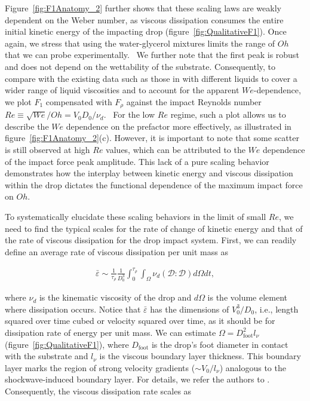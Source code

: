 \documentclass{jfm}
\begin{document}
	Figure~\ref{fig:F1Anatomy_2} further shows that these scaling laws are weakly dependent on the Weber number, as viscous dissipation consumes the entire initial kinetic energy of the impacting drop (figure~\ref{fig:QualitativeF1}). Once again, we stress that using the water-glycerol mixtures limits the range of $Oh$ that we can probe experimentally. 
	We further note that the first peak is robust and does not depend on the wettability of the substrate. Consequently, to compare with the existing data such as those in \citet{cheng2021drop} with different liquids to cover a wider range of liquid viscosities and to account for the apparent $We$-dependence, we plot $F_1$ compensated with $F_\rho$ against the impact Reynolds number $Re \equiv \sqrt{We}/Oh = V_0D_0/\nu_d$. 
	For the low $Re$ regime, such a plot allows us to describe the $We$ dependence on the prefactor more effectively, as illustrated in figure~\ref{fig:F1Anatomy_2}(c). However, it is important to note that some scatter is still observed at high $Re$ values, which can be attributed to the $We$ dependence of the impact force peak amplitude. This lack of a pure scaling behavior demonstrates how the interplay between kinetic energy and viscous dissipation within the drop dictates the functional dependence of the maximum impact force on $Oh$.
	
	To systematically elucidate these scaling behaviors in the limit of small $Re$, we need to find the typical scales for the rate of change of kinetic energy and that of the rate of viscous dissipation for the drop impact system. First, we can readily define an average rate of viscous dissipation per unit mass as
	
	\begin{align}
		\bar{\varepsilon} \sim \frac{1}{\tau_\rho}\frac{1}{D_0^3}\int_0^{\tau_\rho}\int_\Omega\nu_d\left(\boldsymbol{\mathcal{D}:\mathcal{D}}\right)d\Omega dt,
	\end{align}
	
	\noindent where $\nu_d$ is the kinematic viscosity of the drop and $d\Omega$ is the volume element where dissipation occurs. Notice that $\bar{\varepsilon}$ has the dimensions of $V_0^3/D_0$, i.e., length squared over time cubed or velocity squared over time, as it should be for dissipation rate of energy per unit mass. We can estimate $\Omega = D_{\text{foot}}^2l_\nu$ (figure~\ref{fig:QualitativeF1}), where $D_{\text{foot}}$ is the drop's foot diameter in contact with the substrate and $l_\nu$ is the viscous boundary layer thickness. This boundary layer marks the region of strong velocity gradients ($\sim V_0/l_\nu$) analogous to the \citet{mirels1955laminar} shockwave-induced boundary layer. For details, we refer the authors to \citet{schlichting2016boundary, Schroll2010, Philippi2016}. Consequently, the viscous dissipation rate scales as
	
\end{document}

